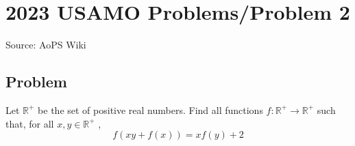 \documentclass[12pt]{article}
\begin{document}
\section*{{2023 USAMO Problems/Problem 2}}
Source: AoPS Wiki

\subsection*{Problem}
Let $\mathbb{R}^{+}$ be the set of positive real numbers. Find all functions $f:\mathbb{R}^{+}\rightarrow\mathbb{R}^{+}$ such that, for all $x, y \in \mathbb{R}^{+}$ , \[f(xy + f(x)) = xf(y) + 2\]
\end{document}
